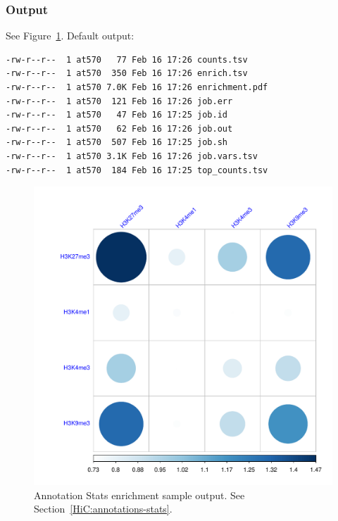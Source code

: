 \subsubsection{Output}\label{HiC:annotations-stats-output} %
See Figure~\ref{fig:annotations-stats}. Default output:
\begin{lstlisting}
-rw-r--r--  1 at570   77 Feb 16 17:26 counts.tsv
-rw-r--r--  1 at570  350 Feb 16 17:26 enrich.tsv
-rw-r--r--  1 at570 7.0K Feb 16 17:26 enrichment.pdf
-rw-r--r--  1 at570  121 Feb 16 17:26 job.err
-rw-r--r--  1 at570   47 Feb 16 17:25 job.id
-rw-r--r--  1 at570   62 Feb 16 17:26 job.out
-rw-r--r--  1 at570  507 Feb 16 17:25 job.sh
-rw-r--r--  1 at570 3.1K Feb 16 17:26 job.vars.tsv
-rw-r--r--  1 at570  184 Feb 16 17:25 top_counts.tsv
\end{lstlisting}
\begin{figure}[!htb]
    \centering
    \includegraphics[width=\textwidth,height=\textheight,keepaspectratio]{figure/annotations-stats_enrichment}
    \caption{Annotation Stats enrichment sample output. See Section~\ref{HiC:annotations-stats}.} %
    \label{fig:annotations-stats}
\end{figure}
\clearpage